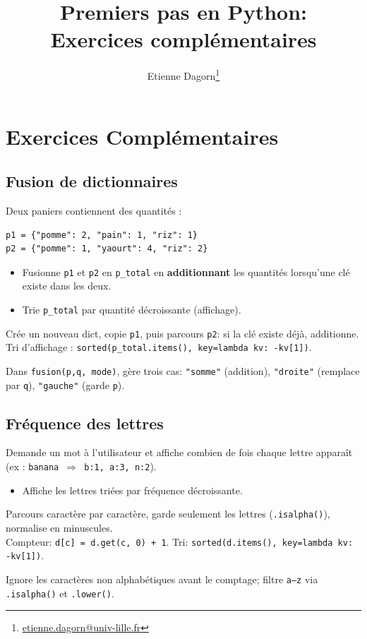 \documentclass[11pt,a4paper]{article}
\title{\textbf{Premiers pas en Python: \\ Exercices complémentaires}}
\author{Etienne Dagorn\thanks{\href{mailto:etienne.dagorn@univ-lille.fr}{{etienne.dagorn@univ-lille.fr}}}}
\date{}
\begin{document}
\maketitle

\tableofcontents

\newpage



\newpage
\section{Exercices Complémentaires} 

\subsection*{Fusion de dictionnaires}
Deux paniers contiennent des quantités :
\begin{lstlisting}
p1 = {"pomme": 2, "pain": 1, "riz": 1}
p2 = {"pomme": 1, "yaourt": 4, "riz": 2}
\end{lstlisting}
\begin{itemize}
    \item Fusionne \texttt{p1} et \texttt{p2} en \texttt{p\_total} en \textbf{additionnant} les quantités lorsqu'une clé existe dans les deux.
    \item Trie \texttt{p\_total} par quantité décroissante (affichage).
\end{itemize}
\begin{tcolorbox}[title=Aide]
Crée un nouveau dict, copie \texttt{p1}, puis parcours \texttt{p2}: si la clé existe déjà, additionne.\\
Tri d'affichage : \texttt{sorted(p\_total.items(), key=lambda kv: -kv[1])}.
\end{tcolorbox}
\begin{tcolorbox}[title=Bonus -- Aide]
Dans \texttt{fusion(p,q, mode)}, gère trois cas: \texttt{"somme"} (addition), \texttt{"droite"} (remplace par \texttt{q}), \texttt{"gauche"} (garde \texttt{p}).
\end{tcolorbox}

\subsection*{Fréquence des lettres}
Demande un mot à l'utilisateur et affiche combien de fois chaque lettre apparaît (ex : \texttt{banana $\Rightarrow$ b:1, a:3, n:2}).
\begin{itemize}
    \item Affiche les lettres triées par fréquence décroissante.
\end{itemize}
\begin{tcolorbox}[title=Aide]
Parcours caractère par caractère, garde seulement les lettres (\texttt{.isalpha()}), normalise en minuscules.\\
Compteur: \texttt{d[c] = d.get(c, 0) + 1}. Tri: \texttt{sorted(d.items(), key=lambda kv: -kv[1])}.
\end{tcolorbox}
\begin{tcolorbox}[title=Bonus -- Aide]
Ignore les caractères non alphabétiques avant le comptage; filtre \texttt{a--z} via \texttt{.isalpha()} et \texttt{.lower()}.
\end{tcolorbox}
\end{document}
